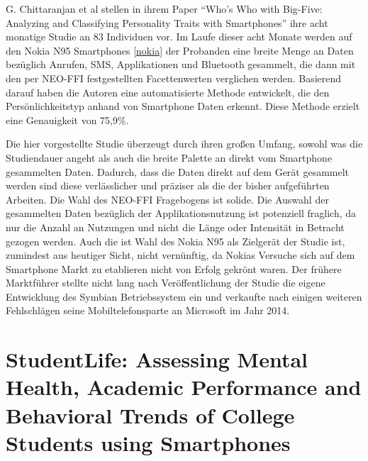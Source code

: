 G. Chittaranjan et al stellen in ihrem Paper "`Who’s Who with Big-Five: Analyzing and Classifying Personality Traits with Smartphones"' ihre acht monatige Studie an 83 Individuen vor.
Im Laufe dieser acht Monate werden auf den Nokia N95 Smartphones \ref{nokia} der Probanden eine breite Menge an Daten bezüglich Anrufen, SMS, Applikationen und Bluetooth gesammelt, 
die dann mit den per NEO-FFI festgestellten Facettenwerten verglichen werden.
Basierend darauf haben die Autoren eine automatisierte Methode entwickelt, die den Persönlichkeitstyp anhand von Smartphone Daten erkennt.
Diese Methode erzielt eine Genauigkeit von 75,9\%.
\par
Die hier vorgestellte Studie überzeugt durch ihren großen Umfang, sowohl was die Studiendauer angeht als auch die breite Palette an direkt vom Smartphone gesammelten Daten.
Dadurch, dass die Daten direkt auf dem Gerät gesammelt werden sind diese verlässlicher und präziser als die der bisher aufgeführten Arbeiten.
Die Wahl des NEO-FFI Fragebogens ist solide.
Die Auswahl der gesammelten Daten bezüglich der Applikationsnutzung ist potenziell fraglich, da nur die Anzahl an Nutzungen und nicht die Länge oder Intensität in Betracht gezogen werden.
Auch die ist Wahl des Nokia N95 als Zielgerät der Studie ist, zumindest aus heutiger Sicht, nicht vernünftig, da Nokias Versuche sich auf dem Smartphone Markt zu etablieren nicht von Erfolg gekrönt waren.
Der frühere Marktführer stellte nicht lang nach Veröffentlichung der Studie die eigene Entwicklung des Symbian Betriebssystem ein\cite{nokiaabort} und verkaufte nach einigen weiteren Fehlschlägen seine Mobiltelefonsparte an Microsoft im Jahr 2014\cite{nokiasell}.  


\section*{StudentLife: Assessing Mental Health, Academic Performance and Behavioral Trends of College Students using Smartphones}

